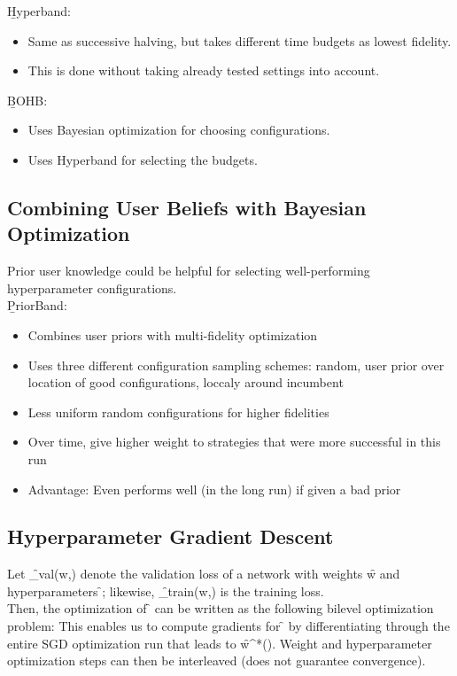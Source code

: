 \b{Hyperband:}
\begin{itemize}
    \item Same as successive halving, but takes different time budgets as lowest fidelity.
    \item This is done without taking already tested settings into account.
\end{itemize}

\b{BOHB:}
\begin{itemize}
    \item Uses Bayesian optimization for choosing configurations.
    \item Uses Hyperband for selecting the budgets.
\end{itemize}

\subsection{Combining User Beliefs with Bayesian Optimization}
Prior user knowledge could be helpful for selecting well-performing hyperparameter configurations.\\

\b{PriorBand:}
\begin{itemize}
    \item Combines user priors with multi-fidelity optimization
    \item Uses three different configuration sampling schemes: random, user prior over location of good configurations, loccaly around incumbent
    \item Less uniform random configurations for higher fidelities
    \item Over time, give higher weight to strategies that were more successful in this run
    \item Advantage: Even performs well (in the long run) if given a bad prior
\end{itemize}

\subsection{Hyperparameter Gradient Descent}
Let \f{\fL_{val}(w,\theta)} denote the validation loss of a network with weights \f{w} and
hyperparameters \f{\theta}; likewise, \f{\fL_{train}(w,\theta)} is the training loss.\\
Then, the optimization of \f{\theta} can be written as the following bilevel optimization problem:
This enables us to compute gradients for \f{\theta} by differentiating through the entire SGD optimization run that leads to \f{w^*(\theta)}. Weight and hyperparameter optimization steps can then be interleaved (does not guarantee convergence).

